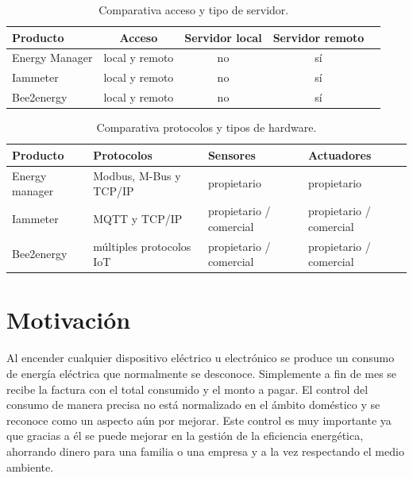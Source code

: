 \begin{table}[h]
	\centering
	\caption[Comparativa de soluciones entre acceso y servidor]{Comparativa acceso y tipo de servidor.}
	\begin{tabular}{l c c c c }    
		\toprule
		\textbf{Producto} & \textbf{Acceso} & \textbf{Servidor  local}   & \textbf{Servidor remoto} \\
		\midrule
		Energy Manager & local y remoto 	& no & sí  \\		
		Iammeter	 & local y remoto	& no & sí  \\
		Bee2energy	 & local y remoto	& no & sí  \\
		\bottomrule
		\hline
	\end{tabular}
	\label{tab:tabla2}
\end{table}

\vspace{1cm}



\begin{table}[h]
	\centering
	\caption[Comparativa de soluciones entre protocolos y hardware]{Comparativa protocolos y tipos de hardware.}
	\begin{tabular}{l p{3cm} p{2cm} p{2cm}}    
		\toprule
		\textbf{Producto} 	 & \textbf{Protocolos}  & \textbf{ Sensores} & \textbf{Actuadores}  \\
		\midrule
		Energy manager & Modbus, M-Bus  y TCP/IP 	& propietario & propietario \\		
		Iammeter	 & MQTT y TCP/IP	& propietario / comercial & propietario / comercial \\
		Bee2energy	 & múltiples protocolos IoT		& propietario / comercial & propietario / comercial\\
		\bottomrule
		\hline
	\end{tabular}
	\label{tab:tabla3}
\end{table}






\section{Motivación}
Al encender cualquier dispositivo eléctrico u electrónico se produce un consumo de energía eléctrica que normalmente se desconoce. Simplemente a fin de mes se recibe la factura con el total consumido y el monto a pagar. El control del consumo de manera precisa no está normalizado en el ámbito doméstico y se reconoce como un aspecto aún por mejorar. Este control es muy importante ya que gracias a él se puede mejorar en la gestión de la eficiencia energética, ahorrando dinero para una familia o una empresa y a la vez respectando el medio ambiente.

